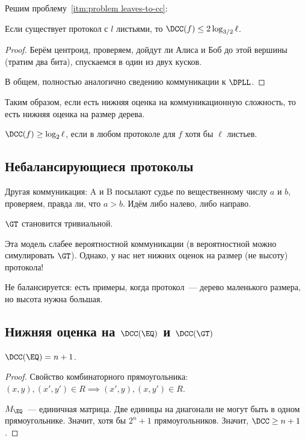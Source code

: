 Решим проблему~\ref{itm:problem leaves-to-cc}:
\begin{theorem}[Балансирование]
    Если существует протокол с $l$ листьями, то $\DCC(f) \le 2 \log_{3 / 2} \ell$.
\end{theorem}

\begin{proof}
    Берём центроид, проверяем, дойдут ли Алиса и Боб до этой вершины (тратим два бита), спускаемся в один
    из двух кусков.

    В общем, полностью аналогично сведению коммуникации к $\DPLL$.
\end{proof}

Таким образом, если есть нижняя оценка на коммуникационную сложность, то есть нижняя оценка на размер
дерева.

\begin{remark}
    $\DCC(f) \ge \log_2 \ell$, если в любом протоколе для $f$ хотя бы $\ell$ листьев.
\end{remark}


\subsection{Небалансирующиеся протоколы}
Другая коммуникация: A и B посылают судье по вещественному числу $a$ и $b$, проверяем, правда ли, что $a
> b$. Идём либо налево, либо направо.

$\GT$ становится тривиальной.

Эта модель слабее вероятностной коммуникации (в вероятностной можно симулировать $\GT$).
Однако, у нас нет нижних оценок на размер (не высоту) протокола!

Не балансируется: есть примеры, когда протокол~--- дерево маленького размера, но высота нужна большая.

\subsection{Нижняя оценка на \texorpdfstring{$\DCC(\EQ)$}{D(EQ)} и \texorpdfstring{$\DCC(\GT)$}{D(GT)}}

\begin{theorem}
    $\DCC(\EQ) = n + 1$.
\end{theorem}

\begin{proof}
    Свойство комбинаторного прямоугольника: $(x, y), (x', y') \in R \implies\allowbreak (x', y), (x,
    y')\in R$.

    $M_{\EQ}$~--- единичная матрица. Две единицы на диагонали не могут быть в одном
    прямоугольнике. Значит, хотя бы $2^n + 1$ прямоугольников. Значит, $\DCC \ge n + 1$.
\end{proof}


